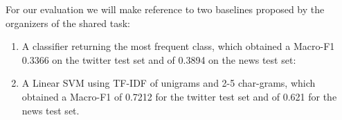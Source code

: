 \documentclass[a4paper, 10pt, twocolumn, DIV=calc]{scrartcl}
\begin{document}
For our evaluation we will make reference to two baselines proposed by the organizers of the shared task:

\begin{enumerate}
    \item A classifier returning the most frequent class, which obtained a Macro-F1 0.3366 on the twitter test set and of 0.3894 on the news test set:
    \item A Linear SVM using TF-IDF of unigrams and 2-5 char-grams, which obtained a Macro-F1 of 0.7212  for the twitter test set and of 0.621 for the news test set.
\end{enumerate}

\printbibliography{}
\end{document}
